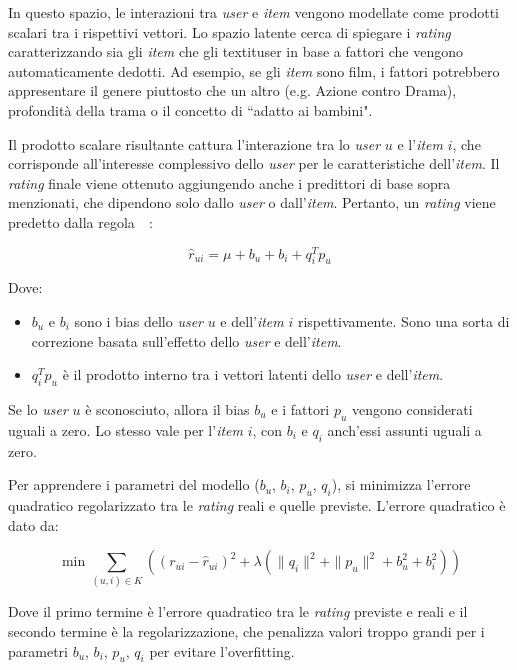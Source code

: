 In questo spazio, le interazioni tra \textit{user} e \textit{item} vengono modellate come prodotti scalari tra i rispettivi vettori. Lo spazio latente cerca di spiegare i \textit{rating} caratterizzando sia gli \textit{item} che gli textit{user} in base a fattori che vengono automaticamente dedotti. Ad esempio, se gli \textit{item} sono film, i fattori potrebbero appresentare il genere piuttosto che un altro (e.g. Azione contro Drama), profondità della trama o il concetto di ``adatto ai bambini".

Il prodotto scalare risultante cattura l'interazione tra lo \textit{user} $u$ e l'\textit{item} $i$, che corrisponde all'interesse complessivo dello \textit{user} per le caratteristiche dell'\textit{item}. Il \textit{rating} finale viene ottenuto aggiungendo anche i predittori di base sopra menzionati, che dipendono solo dallo \textit{user} o dall'\textit{item}. Pertanto, un \textit{rating} viene predetto dalla regola~\cite{SVD_analysis}~\cite{Recommendation_book}:

\[
\hat{r}_{ui} = \mu + b_u + b_i + q_i^T p_u
\]

Dove:
\begin{itemize}
    \item $ b_u $ e $ b_i $ sono i bias dello \textit{user} $u$ e dell'\textit{item} $i$ rispettivamente. Sono una sorta di correzione basata sull'effetto dello \textit{user} e dell'\textit{item}.
    \item $ q_i^T p_u $ è il prodotto interno tra i vettori latenti dello \textit{user} e dell'\textit{item}.
\end{itemize}

Se lo \textit{user} $u$ è sconosciuto, allora il bias $b_u$ e i fattori $p_u$ vengono considerati uguali a zero. Lo stesso vale per
l'\textit{item} $i$, con $b_i$ e $q_i$ anch'essi assunti uguali a zero.

Per apprendere i parametri del modello ($b_u$, $b_i$, $p_u$, $q_i$), si minimizza l'errore quadratico regolarizzato tra le \textit{rating} reali e quelle previste. L'errore quadratico è dato da:

\[
\min \sum\limits_{(u,i) \in K} \left( (r_{ui} - \hat{r}_{ui})^2 + \lambda (\|q_i\|^2 + \|p_u\|^2 + b_u^2 + b_i^2) \right)
\]


Dove il primo termine è l'errore quadratico tra le \textit{rating} previste e reali e il secondo termine è la regolarizzazione, che penalizza valori troppo grandi per i parametri $b_u$, $b_i$, $p_u$, $q_i$ per evitare l'overfitting.

